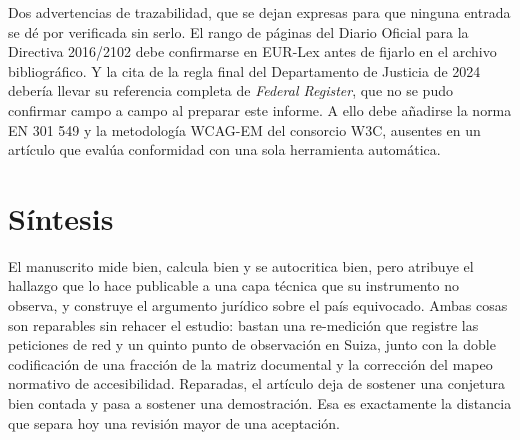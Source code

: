 \documentclass[11pt,a4paper]{article}
\begin{document}
Dos advertencias de trazabilidad, que se dejan expresas para que ninguna entrada se d\'e por verificada sin serlo. El rango de p\'aginas del Diario Oficial para la Directiva 2016/2102 debe confirmarse en EUR-Lex antes de fijarlo en el archivo bibliogr\'afico. Y la cita de la regla final del Departamento de Justicia de 2024 deber\'ia llevar su referencia completa de \emph{Federal Register}, que no se pudo confirmar campo a campo al preparar este informe. A ello debe a\~nadirse la norma EN 301 549 y la metodolog\'ia WCAG-EM del consorcio W3C, ausentes en un art\'iculo que eval\'ua conformidad con una sola herramienta autom\'atica.

\section{S\'intesis}

El manuscrito mide bien, calcula bien y se autocritica bien, pero atribuye el hallazgo que lo hace publicable a una capa t\'ecnica que su instrumento no observa, y construye el argumento jur\'idico sobre el pa\'is equivocado. Ambas cosas son reparables sin rehacer el estudio: bastan una re-medici\'on que registre las peticiones de red y un quinto punto de observaci\'on en Suiza, junto con la doble codificaci\'on de una fracci\'on de la matriz documental y la correcci\'on del mapeo normativo de accesibilidad. Reparadas, el art\'iculo deja de sostener una conjetura bien contada y pasa a sostener una demostraci\'on. Esa es exactamente la distancia que separa hoy una revisi\'on mayor de una aceptaci\'on.
\end{document}
